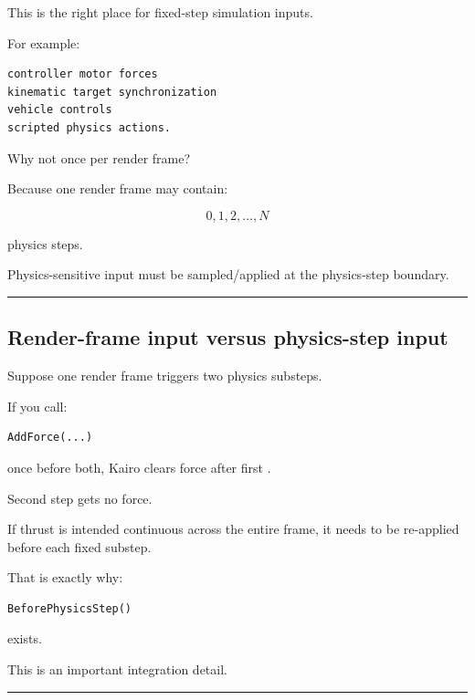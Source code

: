 This is the right place for fixed-step simulation inputs.

For example:

\begin{verbatim}
controller motor forces
kinematic target synchronization
vehicle controls
scripted physics actions.
\end{verbatim}

Why not once per render frame?

Because one render frame may contain:

\[
0,1,2,\dots,N
\]

physics steps.

Physics-sensitive input must be sampled/applied at the physics-step boundary.

\begin{center}\rule{0.5\linewidth}{0.5pt}\end{center}

\subsection{Render-frame input versus physics-step input}\label{06-engine-ii-ch037-render-frame-input-versus-physics-step-input}

\hypertarget{06-engine-ii-ch037-render-frame-input-versus-physics-step-input}{}

Suppose one render frame triggers two physics substeps.

If you call:

\begin{verbatim}
AddForce(...)
\end{verbatim}

once before both, Kairo clears force after first .

Second step gets no force.

If thrust is intended continuous across the entire frame, it needs to be re-applied before each fixed substep.

That is exactly why:

\begin{verbatim}
BeforePhysicsStep()
\end{verbatim}

exists.

This is an important integration detail.

\begin{center}\rule{0.5\linewidth}{0.5pt}\end{center}

